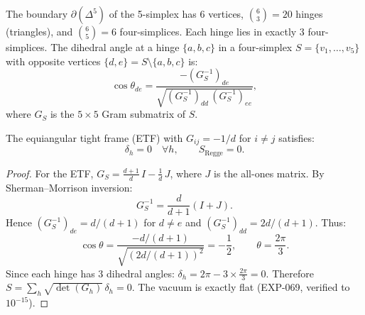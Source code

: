 The boundary $\partial(\Delta^5)$ of the 5-simplex has 6 vertices, $\binom{6}{3}=20$ hinges (triangles), and $\binom{6}{5}=6$ four-simplices.  Each hinge lies in exactly 3 four-simplices.  The dihedral angle at a hinge $\{a,b,c\}$ in a four-simplex $S = \{v_1,\ldots,v_5\}$ with opposite vertices $\{d,e\} = S \setminus \{a,b,c\}$ is:
\begin{equation}
\cos\theta_{de} = \frac{-(G^{-1}_S)_{de}}{\sqrt{(G^{-1}_S)_{dd}\,(G^{-1}_S)_{ee}}},
\end{equation}
where $G_S$ is the $5 \times 5$ Gram submatrix of $S$.

\begin{theorem}
\label{thm:flat_vacuum}
The equiangular tight frame (ETF) with $G_{ij} = -1/d$ for $i \ne j$ satisfies:
\begin{equation}
\delta_h = 0 \quad \forall h, \qquad S_{\mathrm{Regge}} = 0.
\end{equation}
\end{theorem}
\begin{proof}
For the ETF, $G_S = \frac{d+1}{d}\,I - \frac{1}{d}\,J$, where $J$ is the all-ones matrix.  By Sherman--Morrison inversion:
\begin{equation}
G_S^{-1} = \frac{d}{d+1}(I + J).
\end{equation}
Hence $(G^{-1}_S)_{de} = d/(d+1)$ for $d \ne e$ and $(G^{-1}_S)_{dd} = 2d/(d+1)$.  Thus:
\begin{equation}
\cos\theta = \frac{-d/(d+1)}{\sqrt{(2d/(d+1))^2}} = -\frac{1}{2}, \qquad \theta = \frac{2\pi}{3}.
\end{equation}
Since each hinge has 3 dihedral angles: $\delta_h = 2\pi - 3 \times \frac{2\pi}{3} = 0$.  Therefore $S = \sum_h \sqrt{\det(G_h)}\,\delta_h = 0$.  The vacuum is exactly flat (EXP-069, verified to $10^{-15}$).
\end{proof}

